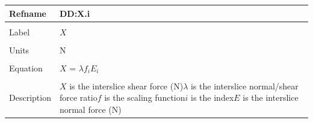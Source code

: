 \documentclass[12pt]{article}
\begin{document}
\noindent \begin{minipage}{\textwidth}
\begin{tabular}{p{} p{}}
\toprule \textbf{Refname} & \textbf{DD:X.i}
\label{DD:X.i}
\\ \midrule \\
Label & $X$
\\ \midrule \\
Units & N
\\ \midrule \\
Equation & $X$ = $\lambda{}f_{i}E_{i}$
\\ \midrule \\
Description & $X$ is the interslice shear force (N)\newline$\lambda{}$ is the interslice normal/shear force ratio\newline$f$ is the scaling function\newline$i$ is the index\newline$E$ is the interslice normal force (N)
\\ \bottomrule \end{tabular}
\end{minipage}\\
~\newline
\end{document}
